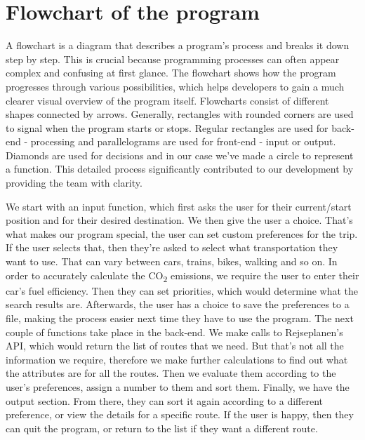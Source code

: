 \section{Flowchart of the program}

A flowchart is a diagram that describes a program's process and breaks it down step by step.
This is crucial because programming processes can often appear complex and confusing at first glance.
The flowchart shows how the program progresses through various possibilities, which helps developers to gain a much 
clearer visual overview of the program itself.
Flowcharts consist of different shapes connected by arrows.
Generally, rectangles with rounded corners are used to signal when the program starts or stops. 
Regular rectangles are used for back-end - processing and parallelograms are used for front-end - input or output. 
Diamonds are used for decisions and in our case we've made a circle to represent a function. 
This detailed process significantly contributed to our development by providing the team with clarity.

We start with an input function, which first asks the user for their current/start position and for their desired
destination.
We then give the user a choice. 
That's what makes our program special, the user can set custom preferences for the trip. 
If the user selects that, then they're asked to select what transportation they want to use. 
That can vary between cars, trains, bikes, walking and so on. 
In order to accurately calculate the \unit{CO_{2}} emissions, we require the user to enter their car's fuel efficiency. 
Then they can set priorities, which would determine what the search results are. 
Afterwards, the user has a choice to save the preferences to a file, making the process easier next time they have to
use the program.
The next couple of functions take place in the back-end.
We make calls to Rejseplanen's API, which would return the list of routes that we need.
But that's not all the information we require, therefore we make further calculations to find out what the attributes
are for all the routes. 
Then we evaluate them according to the user's preferences, assign a number to them and sort them.
Finally, we have the output section. 
From there, they can sort it again according to a different preference, or view the details for a specific route.
If the user is happy, then they can quit the program, or return to the list if they want a different route.



